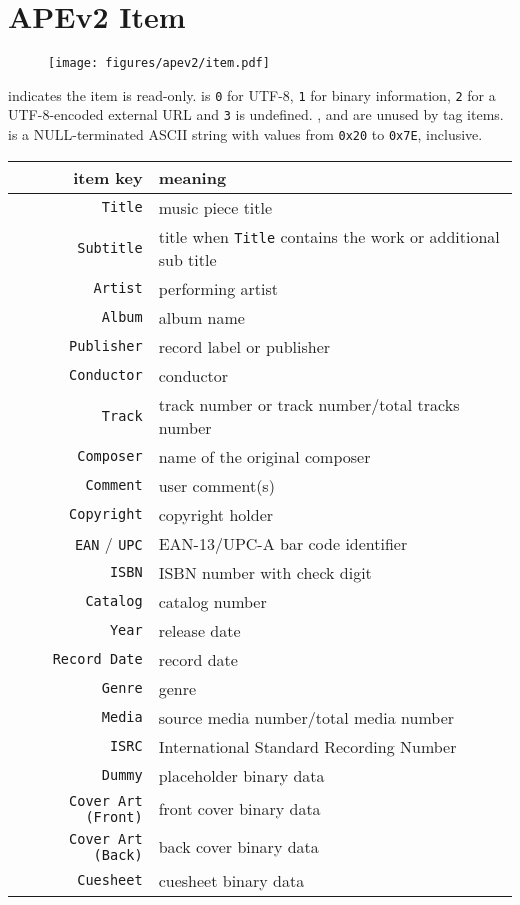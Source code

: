 \section{APEv2 Item}
\begin{figure}[h]
  \texttt{[image: figures/apev2/item.pdf]}
\end{figure}
\par
\noindent
{} indicates the item is read-only.
 is \texttt{0} for UTF-8,
\texttt{1} for binary information,
\texttt{2} for a UTF-8-encoded external URL
and \texttt{3} is undefined.
,  and 
are unused by tag items.
 is a NULL-terminated ASCII string
with values from \texttt{0x20} to \texttt{0x7E}, inclusive.
\begin{table}[h]
{
\begin{tabular}{rl}
item key & meaning \\
\hline
\texttt{Title} & music piece title \\
\texttt{Subtitle} & title when \texttt{Title} contains the work or additional sub title \\
\texttt{Artist} & performing artist \\
\texttt{Album} & album name \\
\texttt{Publisher} & record label or publisher \\
\texttt{Conductor} & conductor \\
\texttt{Track} & track number or track number/total tracks number \\
\texttt{Composer} & name of the original composer \\
\texttt{Comment} & user comment(s) \\
\texttt{Copyright} & copyright holder \\
\texttt{EAN} / \texttt{UPC} & EAN-13/UPC-A bar code identifier \\
\texttt{ISBN} & ISBN number with check digit \\
\texttt{Catalog} & catalog number \\
\texttt{Year} & release date \\
\texttt{Record Date} & record date \\
\texttt{Genre} & genre \\
\texttt{Media} & source media number/total media number \\
\texttt{ISRC} & International Standard Recording Number \\
\texttt{Dummy} & placeholder binary data \\
\texttt{Cover Art (Front)} & front cover binary data \\
\texttt{Cover Art (Back)} & back cover binary data \\
\texttt{Cuesheet} & cuesheet binary data \\
\end{tabular}
}
\end{table}

